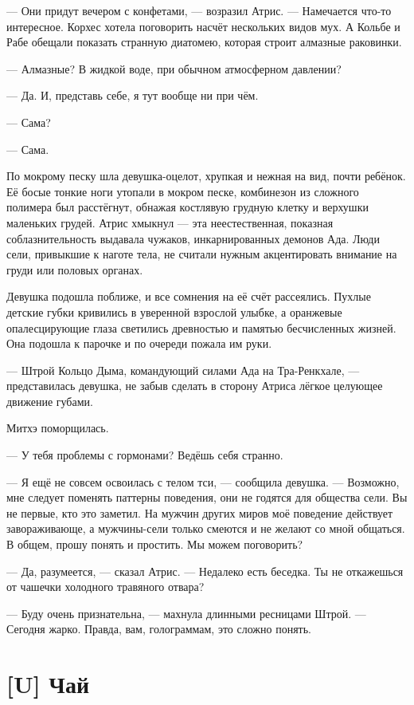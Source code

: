 --- Они придут вечером с конфетами, --- возразил Атрис.
--- Намечается что-то интересное.
Корхес хотела поговорить насчёт нескольких видов мух.
А Кольбе и Рабе обещали показать странную диатомею, которая строит алмазные раковинки.

--- Алмазные?
В жидкой воде, при обычном атмосферном давлении?

--- Да.
И, представь себе, я тут вообще ни при чём.

--- Сама?

--- Сама.

По мокрому песку шла девушка-оцелот, хрупкая и нежная на вид, почти ребёнок.
Её босые тонкие ноги утопали в мокром песке, комбинезон из сложного полимера был расстёгнут, обнажая костлявую грудную клетку и верхушки маленьких грудей.
Атрис хмыкнул --- эта неестественная, показная соблазнительность выдавала чужаков, инкарнированных демонов Ада.
Люди сели, привыкшие к наготе тела, не считали нужным акцентировать внимание на груди или половых органах.

Девушка подошла поближе, и все сомнения на её счёт рассеялись.
Пухлые детские губки кривились в уверенной взрослой улыбке, а оранжевые опалесцирующие глаза светились древностью и памятью бесчисленных жизней.
Она подошла к парочке и по очереди пожала им руки.

--- Штрой Кольцо Дыма, командующий силами Ада на Тра-Ренкхале, --- представилась девушка, не забыв сделать в сторону Атриса лёгкое целующее движение губами.

Митхэ поморщилась.

--- У тебя проблемы с гормонами?
Ведёшь себя странно.

--- Я ещё не совсем освоилась с телом тси, --- сообщила девушка.
--- Возможно, мне следует поменять паттерны поведения, они не годятся для общества сели.
Вы не первые, кто это заметил.
На мужчин других миров моё поведение действует завораживающе, а мужчины-сели только смеются и не желают со мной общаться.
В общем, прошу понять и простить.
Мы можем поговорить?

--- Да, разумеется, --- сказал Атрис.
--- Недалеко есть беседка.
Ты не откажешься от чашечки холодного травяного отвара?

--- Буду очень признательна, --- махнула длинными ресницами Штрой.
--- Сегодня жарко.
Правда, вам, голограммам, это сложно понять.

\section{[U] Чай}

